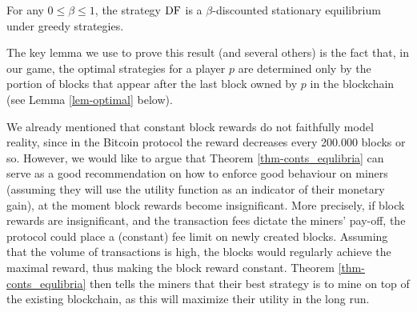 \begin{mythm}\label{thm-conts_equlibria}
For any $0 \leq \beta \leq 1$, the strategy $\text{\rm DF}$ is a $\beta$-discounted stationary equilibrium under greedy strategies. 
\end{mythm} 

The key lemma we use to prove this result (and several others) is the fact that, in our game, the optimal strategies for a player $p$ are determined only by the portion 
of blocks that appear after the last block owned by $p$ in the blockchain (see Lemma \ref{lem-optimal} below).

%
%
%
%
%


We already mentioned that constant block rewards do not faithfully model reality, since in the Bitcoin protocol the reward decreases every 200.000 blocks or so. However, we would like to argue that Theorem \ref{thm-conts_equlibria} can serve as a good recommendation on how to enforce good behaviour on miners (assuming they will use the utility function as an indicator of their monetary gain), at the moment block rewards become insignificant. More precisely, if block rewards are insignificant, and the transaction fees dictate the miners' pay-off, the protocol could place a (constant) fee limit on newly created blocks. Assuming that the volume of transactions is high, the blocks would regularly achieve the maximal reward, thus making the block reward constant. Theorem \ref{thm-conts_equlibria} then tells the miners that their best strategy is to mine on top of the existing blockchain, as this will maximize their utility in the long run.